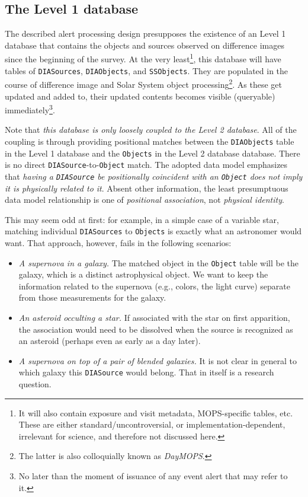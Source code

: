 \documentclass[12pt]{article}
\newcommand{\code}[1]{\texttt{#1}}
\newcommand{\DIASource}{\code{DIASource}\xspace}
\newcommand{\DIASources}{\code{DIASources}\xspace}
\newcommand{\DIAObjects}{\code{DIAObjects}\xspace}
\newcommand{\DB}{{Level 1 database}\xspace}
\newcommand{\DR}{{Level 2 database}\xspace}
\newcommand{\Object}{\code{Object}\xspace}
\newcommand{\Objects}{\code{Objects}\xspace}
\newcommand{\SSObjects}{\code{SSObjects}\xspace}
\begin{document}
\subsection{The \DB}
\label{sec:level1db}

The described alert processing design presupposes the existence of an \DB that contains the objects and sources observed on difference images since the beginning of the survey. At the very least\footnote{It will also contain exposure and visit metadata, MOPS-specific tables, etc. These are either standard/uncontroversial, or implementation-dependent, irrelevant for science, and therefore not discussed here.}, this database will have tables of \DIASources, \DIAObjects, and \SSObjects. They are populated in the course of difference image and Solar System object processing\footnote{The latter is also colloquially known as {\em DayMOPS}.}. As these get updated and added to, their updated contents becomes visible (queryable) immediately\footnote{No later than the moment of issuance of any event alert that may refer to it.}.

Note that {\em this database is only loosely coupled to the \DR}. All of the coupling is through providing positional matches between the \DIAObjects table in the \DB and the \Objects in the \DR database. There is no direct \DIASource-to-\Object match. The adopted data model emphasizes that {\em having a \DIASource be positionally coincident with an \Object does not imply it is physically related to it}. Absent other information, the least presumptuous data model relationship is one of {\em positional association}, not {\em physical identity}.

This may seem odd at first: for example, in a simple case of a variable star, matching individual \DIASources to \Objects is exactly what an astronomer would want. That approach, however, fails in the following scenarios:
\begin{itemize}
\item {\em A supernova in a galaxy.} The matched object in the \Object table will be the galaxy, which is a distinct astrophysical object. We want to keep the information related to the supernova (e.g., colors, the light curve) separate from those measurements for the galaxy.
\item {\em An asteroid occulting a star.} If associated with the star on first apparition, the association would need to be dissolved when the source is recognized as an asteroid (perhaps even as early as a day later).
\item {\em A supernova on top of a pair of blended galaxies.} It is not clear in general to which galaxy this \DIASource would belong. That in itself is a research question.
\end{itemize}
\end{document}
